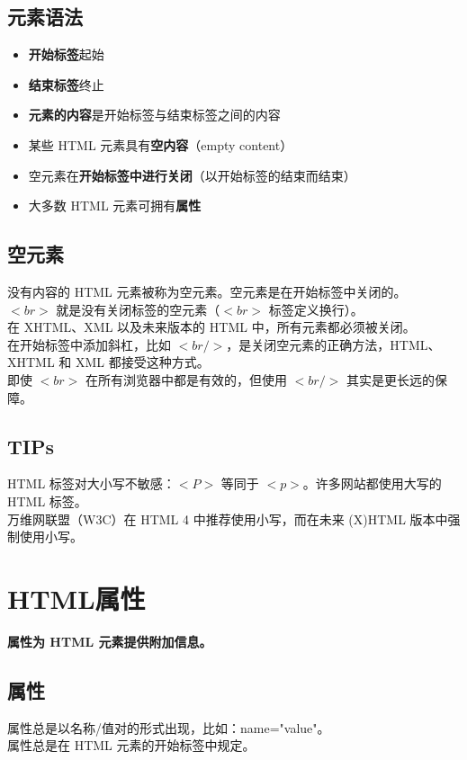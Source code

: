 \documentclass[10pt,UTF8]{ctexart}
\begin{document}
\subsection{元素语法}
\begin{itemize}
\item \textbf{开始标签}起始
\item \textbf{结束标签}终止
\item \textbf{元素的内容}是开始标签与结束标签之间的内容
\item 某些 HTML 元素具有\textbf{空内容}（empty content）
\item 空元素在\textbf{开始标签中进行关闭}（以开始标签的结束而结束）
\item 大多数 HTML 元素可拥有\textbf{属性}
\end{itemize}

\subsection{空元素}
没有内容的 HTML 元素被称为空元素。空元素是在开始标签中关闭的。\\
$<br>$ 就是没有关闭标签的空元素（$<br>$ 标签定义换行）。\\
在 XHTML、XML 以及未来版本的 HTML 中，所有元素都必须被关闭。\\

在开始标签中添加斜杠，比如 $<br />$，是关闭空元素的正确方法，HTML、XHTML 和 XML 都接受这种方式。\\

即使 $<br>$ 在所有浏览器中都是有效的，但使用 $<br />$ 其实是更长远的保障。
\subsection{TIPs}
HTML 标签对大小写不敏感：$<P>$ 等同于 $<p>$。许多网站都使用大写的 HTML 标签。\\
万维网联盟（W3C）在 HTML 4 中推荐使用小写，而在未来 (X)HTML 版本中强制使用小写。


\section{HTML属性}
\noindent \textbf{属性为 HTML 元素提供附加信息。}
\subsection{属性}
属性总是以名称/值对的形式出现，比如：name="value"。\\
属性总是在 HTML 元素的开始标签中规定。
\end{document}

